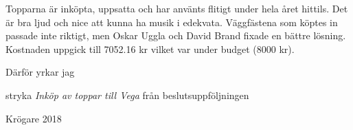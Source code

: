 \documentclass[../_main/handlingar.tex]{subfiles}
\begin{document}

Topparna är inköpta, uppsatta och har använts flitigt under hela året hittils. Det är bra ljud och nice
att kunna ha musik i edekvata. Väggfästena som köptes in passade inte riktigt, men Oskar Uggla och
David Brand fixade en bättre lösning. Kostnaden uppgick till 7052.16 kr vilket var under budget
(8000 kr).

Därför yrkar jag
\begin{attsatser}
    \att stryka \emph{Inköp av toppar till Vega} från beslutsuppföljningen
\end{attsatser}

\begin{signatures}{1}
    \mvh
    \signature{Malin Heyden}{Krögare 2018}
\end{signatures}
\end{document}
